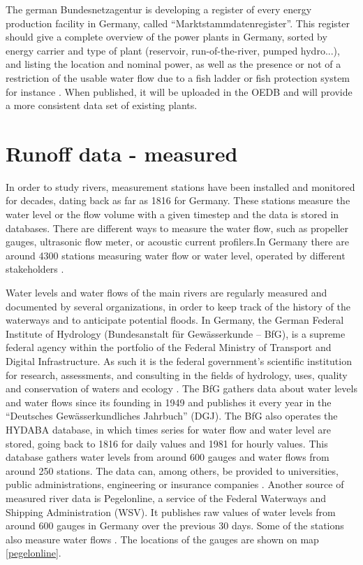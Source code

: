 The german Bundesnetzagentur is developing a register of every energy production facility in Germany, called ``Marktstammdatenregister''. This register should give a complete overview of the power plants in Germany, sorted by energy carrier and type of plant (reservoir, run-of-the-river, pumped hydro...), and listing the location and nominal power, as well as the presence or not of a restriction of the usable water flow due to a fish ladder or fish protection system for instance \cite{MaStR}. \newline
When published, it will be uploaded in the OEDB and will provide a more consistent data set of existing plants.

\section{Runoff data - measured}

\label{sec:meas_runoff}

In order to study rivers, measurement stations have been installed and monitored for decades, dating back as far as 1816 for Germany. These stations measure the water level or the flow volume with a given timestep and the data is stored in databases. There are different ways to measure the water flow, such as propeller gauges, ultrasonic flow meter, or acoustic current profilers.In Germany there are around 4300 stations measuring water flow or water level, operated by different stakeholders \cite{bafg_hyd}.

Water levels and water flows of the main rivers are regularly measured and documented by several organizations, in order to keep track of the history of the waterways and to anticipate potential floods. In Germany, the German Federal Institute of Hydrology (Bundesanstalt für Gewässerkunde – BfG), is a supreme federal agency within the portfolio of the Federal Ministry of Transport and Digital Infrastructure. As such it is the federal government's scientific institution for research, assessments, and consulting in the fields of hydrology, uses, quality and conservation of waters and ecology \cite{bafg}. The BfG gathers data about water levels and water flows since its founding in 1949 and publishes it every year in the ``Deutsches Gewässerkundliches Jahrbuch'' (DGJ). The BfG also operates the HYDABA database, in which times series for water flow and water level are stored, going back to 1816 for daily values and 1981 for hourly values. This database gathers water levels from around 600 gauges and water flows from around 250 stations. The data can, among others, be provided to universities, public administrations, engineering or insurance companies \cite{bafg_hyd}. \newline
Another source of measured river data is Pegelonline, a service of the Federal Waterways and Shipping Administration (WSV). It publishes raw values of water levels from around 600 gauges in Germany over the previous 30 days. Some of the stations also measure water flows \cite{pegelonline}. The locations of the gauges are shown on map \ref{pegelonline}.

